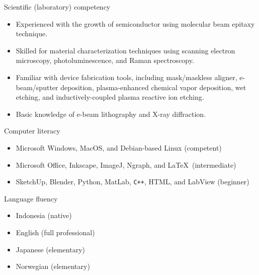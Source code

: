 \noindent Scientific (laboratory) competency
\vspace{-0.1cm}
\begin{itemize}[itemsep=0.7pt, parsep=0.7pt, leftmargin=7mm, label=] %
    \item Experienced with the growth of semiconductor using molecular beam epitaxy technique.
    \item Skilled for material characterization techniques using scanning electron microscopy, photoluminescence, and Raman spectroscopy.
    \item Familiar with device fabrication tools, including mask/maskless aligner, e-beam/sputter deposition, plasma-enhanced chemical vapor deposition, wet etching, and inductively-coupled plasma reactive ion etching. 
    \item Basic knowledge of e-beam lithography and X-ray diffraction.
\end{itemize}

\noindent Computer literacy
\vspace{-0.1cm}
\begin{itemize}[itemsep=0.7pt, parsep=0.7pt, leftmargin=7mm, label=] %
    \item Microsoft Windows, MacOS, and Debian-based Linux (competent)
    \item Microsoft Office, Inkscape, ImageJ, Ngraph, and \LaTeX \ (intermediate)
    \item SketchUp, Blender, Python, MatLab, \verb!C++!, HTML, and LabView (beginner)
\end{itemize}

\noindent Language fluency \\
    \begin{minipage}[t]{.5\linewidth}
        \vspace{-0.2cm}
        \begin{itemize}[itemsep=0.7pt, parsep=0.7pt, leftmargin=7mm, label=] %
            \item Indonesia (native)
            \item English (full professional)
        \end{itemize}
    \end{minipage}\hspace{0.1cm}
    \begin{minipage}[t]{.4\linewidth}
        \vspace{-0.2cm}
        \begin{itemize}[itemsep=0.5pt, parsep=0.7pt, leftmargin=7mm, label=] %
            \item Japanese (elementary)
            \item Norwegian (elementary)
        \end{itemize}
    \end{minipage}

